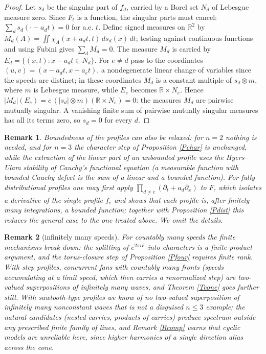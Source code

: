 \documentclass{article}
\newtheorem{remark}{Remark}
\def\R{{\mathbb R}}
\begin{document}
	\begin{proof}
		Let $s_d$ be the singular part of $f_d$, carried by a Borel set $N_d$ of Lebesgue measure zero. Since $F_t$ is a function, the singular parts must cancel: $\sum_ds_d(\cdot-a_dt)=0$ for a.e. $t$. Define signed measures on $\R^2$ by $M_d(A)=\iint\chi_A(x+a_dt,t)\,ds_d(x)\,dt$; testing against continuous functions and using Fubini gives $\sum_dM_d=0$. The measure $M_d$ is carried by $E_d=\{(x,t):x-a_dt\in N_d\}$. For $e\neq d$ pass to the coordinates $(u,v)=(x-a_dt,x-a_et)$, a nondegenerate linear change of variables since the speeds are distinct; in these coordinates $M_d$ is a constant multiple of $s_d\otimes m$, where $m$ is Lebesgue measure, while $E_e$ becomes $\R\times N_e$. Hence $|M_d|(E_e)=c\,(|s_d|\otimes m)(\R\times N_e)=0$: the measures $M_d$ are pairwise mutually singular. A vanishing finite sum of pairwise mutually singular measures has all its terms zero, so $s_d=0$ for every $d$.
	\end{proof}

	\begin{remark}
		Boundedness of the profiles can also be relaxed: for $n=2$ nothing is needed, and for $n=3$ the character step of Proposition \ref{Pchar} is unchanged, while the extraction of the linear part of an unbounded profile uses the Hyers--Ulam stability of Cauchy's functional equation (a measurable function with bounded Cauchy defect is the sum of a linear and a bounded function). For fully distributional profiles one may first apply $\prod_{d\neq e}(\partial_t+a_d\partial_x)$ to $F$, which isolates a derivative of the single profile $f_e$ and shows that each profile is, after finitely many integrations, a bounded function; together with Proposition \ref{Pdist} this reduces the general case to the one treated above. We omit the details.
	\end{remark}

	\begin{remark}[infinitely many speeds]
		For countably many speeds the finite mechanisms break down: the splitting of $e^{2\pi iF}$ into characters is a finite-product argument, and the torus-closure step of Proposition \ref{Pfour} requires finite rank. With step profiles, concurrent fans with countably many fronts (speeds accumulating at a limit speed, which then carries a renormalized step) are two-valued superpositions of infinitely many waves, and Theorem \ref{Tcone} goes further still. With sawtooth-type profiles we know of no two-valued superposition of infinitely many nonconstant waves that is not a disguised $n\leq 3$ example; the natural candidates (nested carries, products of carries) produce spectrum outside any prescribed finite family of lines, and Remark \ref{Rcomp} warns that cyclic models are unreliable here, since higher harmonics of a single direction alias across the cone.
	\end{remark}
\end{document}
